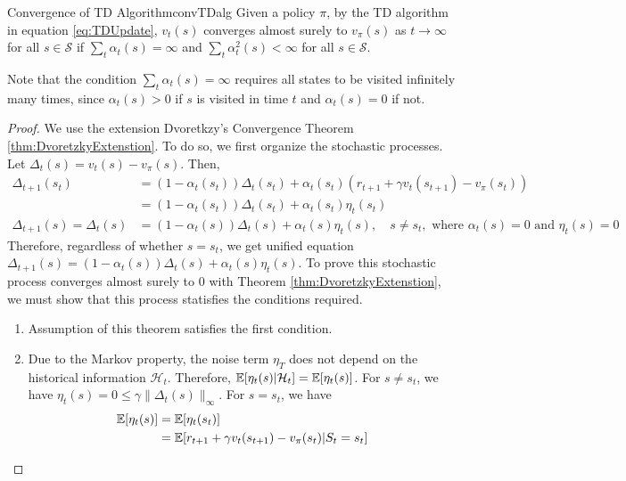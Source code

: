     \begin{thm}{Convergence of TD Algorithm}{convTDalg}
        Given a policy $\pi$, by the TD algorithm in equation \ref{eq:TDUpdate}, $v_t(s)$ converges almost surely to $v_\pi(s)$ as $t \to \infty$ for all $s \in \mathcal{S}$
        if $\sum_t \alpha_t(s) = \infty$ and $\sum_t \alpha_t^2(s) < \infty$ for all $s \in \mathcal{S}$.
    \end{thm}
    Note that the condition $\sum_t \alpha_t(s) = \infty$ requires all states to be visited infinitely many times, since $\alpha_t(s) > 0$ if $s$ is visited in time $t$ and $\alpha_t(s) = 0$ if not.
    \begin{proof}
        We use the extension Dvoretkzy's Convergence Theorem \ref{thm:DvoretzkyExtenstion}. To do so, we first organize the stochastic processes.
        Let $\Delta_t(s) = v_t(s) - v_\pi(s)$. Then, 
        \begin{align}
            \Delta_{t+1}(s_t) &= (1-\alpha_t(s_t))\Delta_t(s_t) + \alpha_t(s_t)(r_{t+1} + \gamma v_t(s_{t+1}) - v_\pi(s_t)) \\
                              &= (1-\alpha_t(s_t))\Delta_t(s_t) + \alpha_t(s_t)\eta_t(s_t) \\
            \Delta_{t+1}(s) = \Delta_t(s) &= (1-\alpha_t(s))\Delta_t(s) + \alpha_t(s)\eta_t(s),\quad s \neq s_t, \text{ where }\alpha_t(s) = 0 \text{ and } \eta_t(s)=0
        \end{align}
        Therefore, regardless of whether $s=s_t$, we get unified equation $\Delta_{t+1}(s) = (1-\alpha_t(s))\Delta_t(s) + \alpha_t(s)\eta_t(s)$.
        To prove this stochastic process converges almost surely to 0 with Theorem \ref{thm:DvoretzkyExtenstion}, we must show that this process statisfies the conditions required.
        \begin{enumerate}
            \item Assumption of this theorem satisfies the first condition.
            \item Due to the Markov property, the noise term $\eta_T$ does not depend on the historical information $\mathcal{H}_t$.
                Therefore, $\mathbb{E}[\eta_t(s)|\mathcal{H}_t]=\mathbb{E}[\eta_t(s)]$. For $s \neq s_t$, we have $\eta_t(s)=0 \leq \gamma \|\Delta_t(s)\|_\infty$.
                For $s = s_t$, we have
                \begin{align}
                    \E[\eta_t(s)] &= \E[\eta_t(s_t)] \\
                                  &= \E[r_{t+1} + \gamma v_t(s_{t+1}) - v_\pi(s_t)|S_t=s_t] \\

\end{align}
\end{enumerate}
\end{proof}
